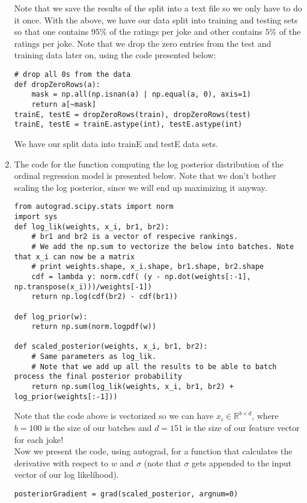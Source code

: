 \documentclass{harvardml}
\theoremstyle{plain}
\begin{document}
\begin{enumerate}
Note that we save the results of the split into a text file so we only have to do it once. With the above, we have our data split into training and testing sets so that one contains $95\%$ of the ratings per joke and other contains $5\%$ of the ratings per joke. Note that we drop the zero entries from the test and training data later on, using the code presented below:
\begin{verbatim}
# drop all 0s from the data
def dropZeroRows(a):
    mask = np.all(np.isnan(a) | np.equal(a, 0), axis=1)
    return a[~mask]
trainE, testE = dropZeroRows(train), dropZeroRows(test)
trainE, testE = trainE.astype(int), testE.astype(int)
\end{verbatim}
We have our split data into trainE and testE data sets.

\vspace{-0.1cm}
\item
The code for the function computing the log posterior distribution of the ordinal regression model is presented below. Note that we don't bother scaling the log posterior, since we will end up maximizing it anyway.
\begin{verbatim}
from autograd.scipy.stats import norm
import sys
def log_lik(weights, x_i, br1, br2):
    # br1 and br2 is a vector of respecive rankings.
    # We add the np.sum to vectorize the below into batches. Note that x_i can now be a matrix
    # print weights.shape, x_i.shape, br1.shape, br2.shape
    cdf = lambda y: norm.cdf( (y - np.dot(weights[:-1], np.transpose(x_i)))/weights[-1])
    return np.log(cdf(br2) - cdf(br1))

def log_prior(w):
    return np.sum(norm.logpdf(w))

def scaled_posterior(weights, x_i, br1, br2):
    # Same parameters as log_lik.
    # Note that we add up all the results to be able to batch process the final posterior probability
    return np.sum(log_lik(weights, x_i, br1, br2) + log_prior(weights[:-1]))
\end{verbatim}
Note that the code above is vectorized so we can have $x_i \in \mathbb{R}^{b \times d}$, where $b = 100$ is the size of our batches and $d = 151$ is the size of our feature vector for each joke! \\

Now we present the code, using autograd, for a function that calculates the derivative with respect to $w$ and $\sigma$ (note that $\sigma$ gets appended to the input vector of our log likelihood).
\begin{verbatim}
posteriorGradient = grad(scaled_posterior, argnum=0)
\end{verbatim}


\end{enumerate}
\end{document}
